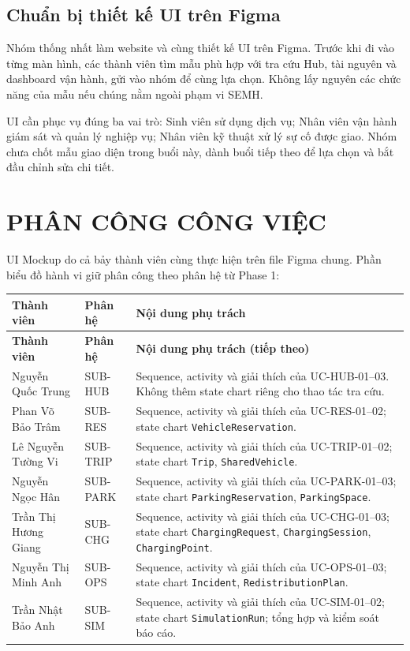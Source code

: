 \documentclass[10pt,a4paper]{article}
\begin{document}
\subsection{Chuẩn bị thiết kế UI trên Figma}
Nhóm thống nhất làm website và cùng thiết kế UI trên Figma. Trước khi đi vào từng màn hình, các thành viên tìm mẫu phù hợp với tra cứu Hub, tài nguyên và dashboard vận hành, gửi vào nhóm để cùng lựa chọn. Không lấy nguyên các chức năng của mẫu nếu chúng nằm ngoài phạm vi SEMH.

UI cần phục vụ đúng ba vai trò: Sinh viên sử dụng dịch vụ; Nhân viên vận hành giám sát và quản lý nghiệp vụ; Nhân viên kỹ thuật xử lý sự cố được giao. Nhóm chưa chốt mẫu giao diện trong buổi này, dành buổi tiếp theo để lựa chọn và bắt đầu chỉnh sửa chi tiết.

\section{PHÂN CÔNG CÔNG VIỆC}
UI Mockup do cả bảy thành viên cùng thực hiện trên file Figma chung. Phần biểu đồ hành vi giữ phân công theo phân hệ từ Phase 1:

\begingroup
\small
\renewcommand{\arraystretch}{1.15}
\begin{longtable}{|L{37mm}|L{24mm}|L{81mm}|}
  \hline
  \textbf{Thành viên} & \textbf{Phân hệ} & \textbf{Nội dung phụ trách}\\\hline
  \endfirsthead
  \hline
  \textbf{Thành viên} & \textbf{Phân hệ} & \textbf{Nội dung phụ trách (tiếp theo)}\\\hline
  \endhead
  Nguyễn Quốc Trung & SUB-HUB & Sequence, activity và giải thích của UC-HUB-01--03. Không thêm state chart riêng cho thao tác tra cứu.\\\hline
  Phan Võ Bảo Trâm & SUB-RES & Sequence, activity và giải thích của UC-RES-01--02; state chart \texttt{VehicleReservation}.\\\hline
  Lê Nguyễn Tường Vi & SUB-TRIP & Sequence, activity và giải thích của UC-TRIP-01--02; state chart \texttt{Trip}, \texttt{SharedVehicle}.\\\hline
  Nguyễn Ngọc Hân & SUB-PARK & Sequence, activity và giải thích của UC-PARK-01--03; state chart \texttt{ParkingReservation}, \texttt{ParkingSpace}.\\\hline
  Trần Thị Hương Giang & SUB-CHG & Sequence, activity và giải thích của UC-CHG-01--03; state chart \texttt{ChargingRequest}, \texttt{ChargingSession}, \texttt{ChargingPoint}.\\\hline
  Nguyễn Thị Minh Anh & SUB-OPS & Sequence, activity và giải thích của UC-OPS-01--03; state chart \texttt{Incident}, \texttt{RedistributionPlan}.\\\hline
  Trần Nhật Bảo Anh & SUB-SIM & Sequence, activity và giải thích của UC-SIM-01--02; state chart \texttt{SimulationRun}; tổng hợp và kiểm soát báo cáo.\\\hline
\end{longtable}
\endgroup
\end{document}
